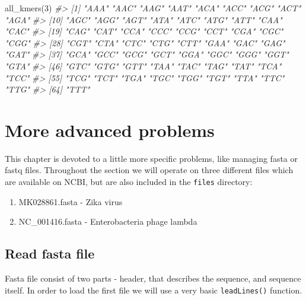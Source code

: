 \documentclass[
]{book}
\newenvironment{Shaded}{\begin{snugshade}}{\end{snugshade}}
\newcommand{\CommentTok}[1]{\textcolor[rgb]{0.56,0.35,0.01}{\textit{#1}}}
\newcommand{\DecValTok}[1]{\textcolor[rgb]{0.00,0.00,0.81}{#1}}
\newcommand{\FunctionTok}[1]{\textcolor[rgb]{0.00,0.00,0.00}{#1}}
\newcommand{\NormalTok}[1]{#1}
\begin{document}
\begin{Shaded}
\begin{Highlighting}[]
\FunctionTok{all\_kmers}\NormalTok{(}\DecValTok{3}\NormalTok{)}
\CommentTok{\#\textgreater{}  [1] "AAA" "AAC" "AAG" "AAT" "ACA" "ACC" "ACG" "ACT" "AGA"}
\CommentTok{\#\textgreater{} [10] "AGC" "AGG" "AGT" "ATA" "ATC" "ATG" "ATT" "CAA" "CAC"}
\CommentTok{\#\textgreater{} [19] "CAG" "CAT" "CCA" "CCC" "CCG" "CCT" "CGA" "CGC" "CGG"}
\CommentTok{\#\textgreater{} [28] "CGT" "CTA" "CTC" "CTG" "CTT" "GAA" "GAC" "GAG" "GAT"}
\CommentTok{\#\textgreater{} [37] "GCA" "GCC" "GCG" "GCT" "GGA" "GGC" "GGG" "GGT" "GTA"}
\CommentTok{\#\textgreater{} [46] "GTC" "GTG" "GTT" "TAA" "TAC" "TAG" "TAT" "TCA" "TCC"}
\CommentTok{\#\textgreater{} [55] "TCG" "TCT" "TGA" "TGC" "TGG" "TGT" "TTA" "TTC" "TTG"}
\CommentTok{\#\textgreater{} [64] "TTT"}
\end{Highlighting}
\end{Shaded}

\hypertarget{advanced}{%
\chapter{More advanced problems}\label{advanced}}

This chapter is devoted to a little more specific problems, like managing fasta or fastq files. Throughout the section we will operate on three different files which are available on NCBI, but are also included in the \texttt{files} directory:

\begin{enumerate}
\def\labelenumi{\arabic{enumi}.}
\item
  MK028861.fasta - Zika virus
\item
  NC\_001416.fasta - Enterobacteria phage lambda
\end{enumerate}

\hypertarget{read-fasta-file}{%
\section{Read fasta file}\label{read-fasta-file}}

Fasta file consist of two parts - header, that describes the sequence, and sequence itself. In order to load the first file we will use a very basic \texttt{leadLines()} function.
\end{document}

